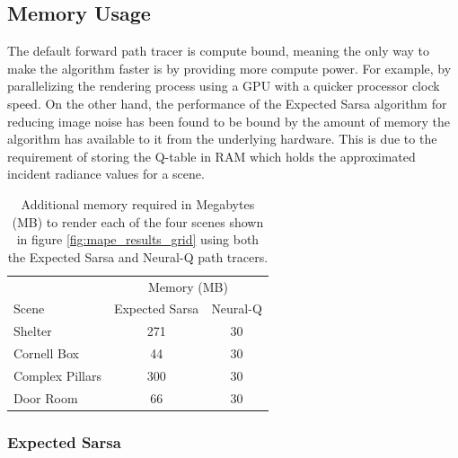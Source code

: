 \documentclass[../dissertation.tex]{subfiles}
\begin{document}
\subsection{Memory Usage}

The default forward path tracer is compute bound, meaning the only way to make the algorithm faster is by providing more compute power. For example, by parallelizing the rendering process using a GPU with a quicker processor clock speed. On the other hand, the performance of the Expected Sarsa algorithm for reducing image noise has been found to be bound by the amount of memory the algorithm has available to it from the  underlying hardware. This is due to the requirement of storing the Q-table in RAM which holds the approximated incident radiance values for a scene.

\begin{table}[h]
	\centering
	\begin{tabular}{lcc}
		\toprule
		& \multicolumn{2}{c}{Memory (MB)} \\ \cmidrule(lr){2-3}
		Scene & Expected Sarsa & Neural-Q \\
		\midrule
		Shelter & 271 & 30 \\
		Cornell Box & 44 & 30 \\
		Complex Pillars & 300 & 30 \\
		Door Room & 66 & 30 \\
		\bottomrule
	\end{tabular}
	\caption{Additional memory required in Megabytes (MB) to render each of the four scenes shown in figure \ref{fig:mape_results_grid} using both the Expected Sarsa and Neural-Q path tracers.}
	\label{tab:memory_usage}
\end{table}

\subsubsection{Expected Sarsa}
\end{document}
